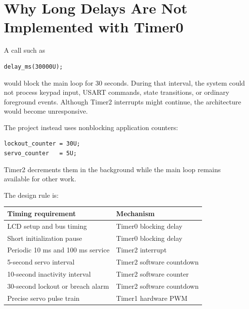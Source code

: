 \documentclass[11pt,a4paper]{article}
\begin{document}
\section{Why Long Delays Are Not Implemented with Timer0}
A call such as
\begin{lstlisting}[style=cstyle]
delay_ms(30000U);
\end{lstlisting}
would block the main loop for 30 seconds. During that interval, the system could not process keypad input, USART commands, state transitions, or ordinary foreground events. Although Timer2 interrupts might continue, the architecture would become unresponsive.

The project instead uses nonblocking application counters:
\begin{lstlisting}[style=cstyle]
lockout_counter = 30U;
servo_counter   = 5U;
\end{lstlisting}
Timer2 decrements them in the background while the main loop remains available for other work.

The design rule is:
\begin{center}
\begin{tabular}{ll}
\toprule
Timing requirement & Mechanism \\
\midrule
LCD setup and bus timing & Timer0 blocking delay \\
Short initialization pause & Timer0 blocking delay \\
Periodic 10 ms and 100 ms service & Timer2 interrupt \\
5-second servo interval & Timer2 software countdown \\
10-second inactivity interval & Timer2 software counter \\
30-second lockout or breach alarm & Timer2 software countdown \\
Precise servo pulse train & Timer1 hardware PWM \\
\bottomrule
\end{tabular}
\end{center}
\end{document}
